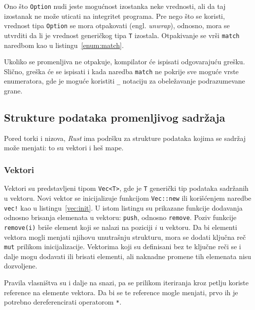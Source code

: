 \documentclass[12pt,oneside]{memoir}
\begin{document}


Ono što \texttt{Option} nudi jeste mogućnost izostanka neke vrednosti, ali da taj izostanak ne
može uticati na integritet programa. Pre nego što se koristi, vrednost tipa \texttt{Option}
se mora otpakovati (engl. \emph{unwrap}), odnosno, mora se utvrditi da li je vrednost generičkog
tipa \texttt{T} izostala. Otpakivanje se vrši \texttt{match} naredbom kao u
listingu~\ref{enum:match}.



Ukoliko se promenljiva ne otpakuje, kompilator će ispisati odgovarajuću grešku. Slično, greška će
se ispisati i kada naredba \texttt{match} ne pokrije sve moguće vrste enumeratora, gde je moguće
koristiti \texttt{\_} notaciju za obeležavanje podrazumevane grane.

\subsection{Strukture podataka promenljivog sadržaja}
Pored torki i nizova, \emph{Rust} ima podršku za strukture podataka kojima se sadržaj
može menjati: to su vektori i heš mape.

\subsubsection{Vektori}
Vektori su predstavljeni tipom \texttt{Vec<T>}, gde je \texttt{T} generički tip
podataka sadržanih
u vektoru. Novi vektor se inicijalizuje funkcijom \texttt{Vec::new} ili korišćenjem
naredbe \texttt{vec!} kao u listingu~\ref{vec:init}. U istom listingu su prikazane funkcije
dodavanja odnosno brisanja elemenata u vektoru: \texttt{push}, odnosno \texttt{remove}.
Poziv funkcije \texttt{remove(i)} briše element koji se nalazi na poziciji $i$ u vektoru.
Da bi elementi vektora mogli menjati njihovu unutrašnju strukturu, mora se
dodati ključna reč \texttt{mut} prilikom inicijalizacije. Vektorima koji su definisani bez te
ključne reči se i dalje mogu dodavati ili brisati elementi, ali naknadne promene tih
elemenata nisu dozvoljene.

Pravila vlasništva su i dalje na snazi, pa se prilikom iteriranja kroz petlju
koriste reference na elemente vektora. Da bi se te reference mogle menjati, prvo
ih je potrebno dereferencirati operatorom \texttt{*}.
\end{document}
